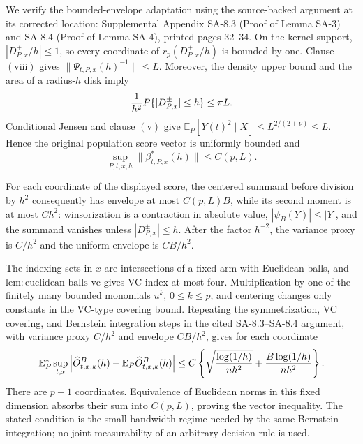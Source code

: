 We verify the bounded-envelope adaptation using the source-backed argument at its corrected location: Supplemental Appendix SA-8.3 (Proof of Lemma SA-3) and SA-8.4 (Proof of Lemma SA-4), printed pages 32--34.  On the kernel support, \(|D^{\pm}_{P,x}/h|\leq1\), so every coordinate of \(r_p(D^{\pm}_{P,x}/h)\) is bounded by one.  Clause \(\mathrm{(viii)}\) gives \(\|\Psi_{t,P,x}(h)^{-1}\|\leq L\).  Moreover, the density upper bound and the area of a radius-\(h\) disk imply
\[
 {1\over h^2}P\{|D^{\pm}_{P,x}|\leq h\}\leq \pi L.
\]
Conditional Jensen and clause \(\mathrm{(v)}\) give \(\mathbb E_P[Y(t)^2\mid X]\leq L^{2/(2+\nu)}\leq L\).  Hence the original population score vector is uniformly bounded and
\[
 \sup_{P,t,x,h}\|\beta^*_{t,P,x}(h)\|\leq C(p,L).
\]

For each coordinate of the displayed score, the centered summand before division by \(h^2\) consequently has envelope at most \(C(p,L)B\), while its second moment is at most \(Ch^2\): winsorization is a contraction in absolute value, \(|\psi_B(Y)|\leq|Y|\), and the summand vanishes unless \(|D^{\pm}_{P,x}|\leq h\).  After the factor \(h^{-2}\), the variance proxy is \(C/h^2\) and the uniform envelope is \(CB/h^2\).

The indexing sets in \(x\) are intersections of a fixed arm with Euclidean balls, and \(\mathrm{lem:euclidean\text{-}balls\text{-}vc}\) gives VC index at most four.  Multiplication by one of the finitely many bounded monomials \(u^k\), \(0\leq k\leq p\), and centering changes only constants in the VC-type covering bound.  Repeating the symmetrization, VC covering, and Bernstein integration steps in the cited SA-8.3--SA-8.4 argument, with variance proxy \(C/h^2\) and envelope \(CB/h^2\), gives for each coordinate
\[
 \mathbb E_P^*\sup_{t,x}
 \left|\widehat O^B_{t,x,k}(h)-\mathbb E_P\widehat O^B_{t,x,k}(h)\right|
 \leq C\left\{
 \sqrt{{\log(1/h)\over nh^2}}+{B\log(1/h)\over nh^2}
 \right\}.
\]
There are \(p+1\) coordinates.  Equivalence of Euclidean norms in this fixed dimension absorbs their sum into \(C(p,L)\), proving the vector inequality.  The stated condition is the small-bandwidth regime needed by the same Bernstein integration; no joint measurability of an arbitrary decision rule is used.